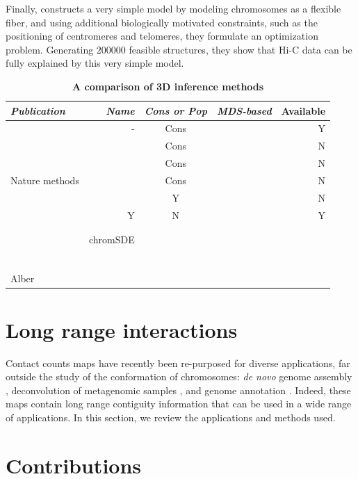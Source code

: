 Finally, \citet{tjong:physical} constructs a very simple model by
modeling chromosomes as a flexible fiber, and using additional biologically
motivated constraints, such as the positioning of centromeres and telomeres,
they formulate an optimization problem. Generating $200000$ feasible
structures, they show that Hi-C data can be fully explained by this very
simple model.

\begin{table}[ht!]
\caption{\bf A comparison of 3D inference methods}
\begin{center}
\begin{tabular}{lrcrr}
\hline
\emph{Publication} & \emph{Name} & \emph{Cons or Pop} & \emph{MDS-based} & Available \\
\hline
\citet{duan:three} & - & Cons & & Y \\
\citet{tanizawa:mapping} & & Cons & & N \\
\citet{ay:three-dimensional} & & Cons & & N\\
Nature methods & & Cons & & N\\
\citet{ben-elazar:spatial} & & Y & & N \\
\citet{varoquaux:statistical} & Y & N & & Y\\
\citet{bau:three-dimensional} & & & &\\
\citet{umbarger:three-dimensional} & & & &\\
\citet{zhang:inference} & chromSDE & & &\\
\citet{rousseau:three} & & & &\\
\citet{hu:bayesian} & & & &\\
\citet{kalhor:genome} & & & &\\
\citet{tokuda:dynamical} & & & &\\
\citet{wong:predictive} & & & &\\
\citet{gehlen:chromosome} & & & &\\
Alber & & & &\\
\end{tabular}
\end{center}
\end{table}


\section{Long range interactions}


Contact counts maps have recently been re-purposed for diverse applications,
far outside the study of the conformation of chromosomes: \textit{de novo}
genome assembly \citep{burton:chromosome, kaplan:high-throughput},
deconvolution of metagenomic samples \citep{burton:species-level,
beitel:strain}, and genome annotation \citep{marie-nelly:filling,
varoquaux:accurate}. Indeed, these maps contain long range contiguity
information that can be used in a wide range of applications.
In this section, we review the applications and methods used.


\section{Contributions}

